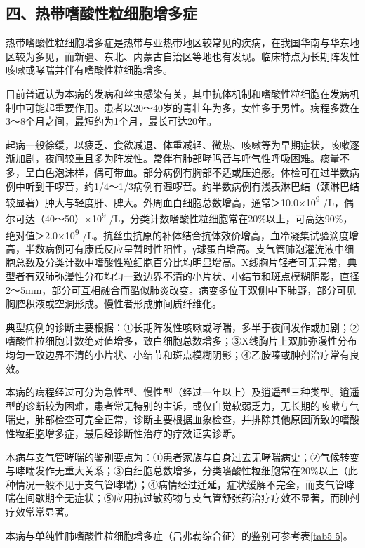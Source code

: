 \subsection{四、热带嗜酸性粒细胞增多症}

热带嗜酸性粒细胞增多症是热带与亚热带地区较常见的疾病，在我国华南与华东地区较为多见，而新疆、东北、内蒙古自治区等地也有发现。临床特点为长期阵发性咳嗽或哮喘并伴有嗜酸性粒细胞增多。

目前普遍认为本病的发病和丝虫感染有关，其中抗体机制和嗜酸性粒细胞在发病机制中可能起重要作用。患者以20～40岁的青壮年为多，女性多于男性。病程多数在3～8个月之间，最短约为1个月，最长可达20年。

起病一般徐缓，以疲乏、食欲减退、体重减轻、微热、咳嗽等为早期症状，咳嗽逐渐加剧，夜间较重且多为阵发性。常伴有肺部哮鸣音与呼气性呼吸困难。痰量不多，呈白色泡沫样，偶可带血。部分病例有胸部不适或压迫感。体检可在过半数病例中听到干啰音，约1/4～1/3病例有湿啰音。约半数病例有浅表淋巴结（颈淋巴结较显著）肿大与轻度肝、脾大。外周血白细胞总数增高，通常＞10.0×10\textsuperscript{9}
/L，偶尔可达（40～50）×10\textsuperscript{9}
/L，分类计数嗜酸性粒细胞常在20\%以上，可高达90\%，绝对值＞2.0×10\textsuperscript{9}
/L。抗丝虫抗原的补体结合抗体效价增高，血冷凝集试验滴度增高，半数病例可有康氏反应呈暂时性阳性，γ球蛋白增高。支气管肺泡灌洗液中细胞总数及分类计数中嗜酸性粒细胞百分比均明显增高。X线胸片轻者可无异常，典型者有双肺弥漫性分布均匀一致边界不清的小片状、小结节和斑点模糊阴影，直径2～5mm，部分可互相融合而酷似肺炎改变。病变多位于双侧中下肺野，部分可见胸腔积液或空洞形成。慢性者形成肺间质纤维化。

典型病例的诊断主要根据：①长期阵发性咳嗽或哮喘，多半于夜间发作或加剧；②嗜酸性粒细胞计数绝对值增多，致白细胞总数增多；③X线胸片上双肺弥漫性分布均匀一致边界不清的小片状、小结节和斑点模糊阴影；④乙胺嗪或胂剂治疗常有良效。

本病的病程经过可分为急性型、慢性型（经过一年以上）及逍遥型三种类型。逍遥型的诊断较为困难，患者常无特别的主诉，或仅自觉软弱乏力，无长期的咳嗽与气喘史，肺部检查可完全正常，诊断主要根据血象检查，并排除其他原因所致的嗜酸性粒细胞增多症，最后经诊断性治疗的疗效证实诊断。

本病与支气管哮喘的鉴别要点为：①患者家族与自身过去无哮喘病史；②气候转变与哮喘发作无重大关系；③白细胞总数增多，分类嗜酸性粒细胞常在20\%以上（此种情况一般不见于支气管哮喘）；④病情经过迁延，症状缓解不完全，而支气管哮喘在间歇期全无症状；⑤应用抗过敏药物与支气管舒张药治疗疗效不显著，而胂剂疗效常常显著。

本病与单纯性肺嗜酸性粒细胞增多症（吕弗勒综合征）的鉴别可参考表\ref{tab5-5}。

